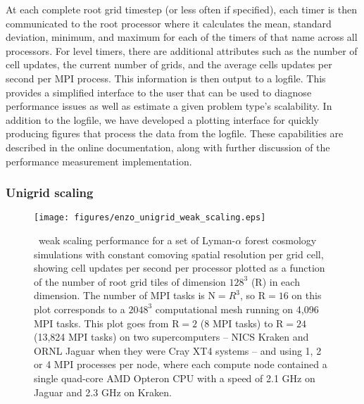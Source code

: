 At each complete root grid timestep (or less often if specified), each
timer is then communicated to the root processor where it calculates
the mean, standard deviation, minimum, and maximum for each of the
timers of that name across all processors.  For level timers, there
are additional attributes such as the number of cell updates, the
current number of grids, and the average cells updates per second per
MPI process.  This information is then output to a logfile.  This
provides a simplified interface to the user that can be used to
diagnose performance issues as well as estimate a given problem type's
scalability.  In addition to the logfile, we have developed a plotting
interface for quickly producing figures that process the data from the
logfile.  These capabilities are described in the online
documentation, along with further discussion of the performance
measurement implementation.

\subsubsection{Unigrid scaling}
\label{sec:weak_scaling}

\begin{figure}
\begin{center}
\texttt{[image: figures/enzo\_unigrid\_weak\_scaling.eps]}
\caption{\enzo\ weak scaling performance for a set of Lyman-$\alpha$
forest cosmology simulations with constant comoving spatial resolution
per grid cell, showing cell updates per second per processor plotted
as a function of the number of root grid tiles of dimension $128^3$
(R) in each dimension.  The number of MPI tasks is N$ = R^3$, so R$ =
16$ on this plot corresponds to a $2048^3$ computational mesh running
on 4,096 MPI tasks.  This plot goes from R$ = 2$ (8 MPI tasks) to R$ =
24$ (13,824 MPI tasks) on two supercomputers -- NICS Kraken and ORNL
Jaguar when they were Cray XT4 systems -- and using 1, 2 or 4 MPI
processes per node, where each compute node contained a single
quad-core AMD Opteron CPU with a speed of 2.1 GHz on Jaguar and 2.3
GHz on Kraken.}
\label{fig.uniscale}
\end{center}
\end{figure}

